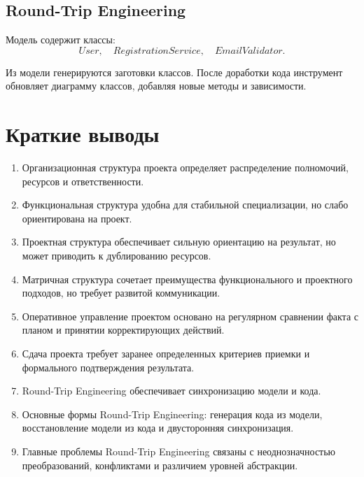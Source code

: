 \documentclass[12pt,a4paper]{article}
\begin{document}
\subsection*{Round-Trip Engineering}

Модель содержит классы:
\[
User,\quad RegistrationService,\quad EmailValidator.
\]

Из модели генерируются заготовки классов. После доработки кода инструмент обновляет диаграмму классов, добавляя новые методы и зависимости.

\section{Краткие выводы}

\begin{enumerate}
    \item Организационная структура проекта определяет распределение полномочий, ресурсов и ответственности.
    \item Функциональная структура удобна для стабильной специализации, но слабо ориентирована на проект.
    \item Проектная структура обеспечивает сильную ориентацию на результат, но может приводить к дублированию ресурсов.
    \item Матричная структура сочетает преимущества функционального и проектного подходов, но требует развитой коммуникации.
    \item Оперативное управление проектом основано на регулярном сравнении факта с планом и принятии корректирующих действий.
    \item Сдача проекта требует заранее определенных критериев приемки и формального подтверждения результата.
    \item Round-Trip Engineering обеспечивает синхронизацию модели и кода.
    \item Основные формы Round-Trip Engineering: генерация кода из модели, восстановление модели из кода и двусторонняя синхронизация.
    \item Главные проблемы Round-Trip Engineering связаны с неоднозначностью преобразований, конфликтами и различием уровней абстракции.
\end{enumerate}
\end{document}
